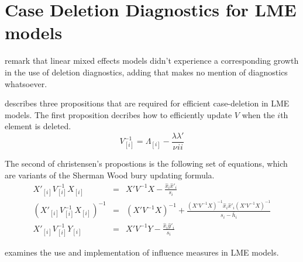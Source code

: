 \documentclass[Chap5amain.tex]{subfiles}
\begin{document}

 
 
 
 \section{Case Deletion Diagnostics for LME models}
 
 \citet{HaslettDillane} remark that linear mixed effects models
 didn't experience a corresponding growth in the use of deletion
 diagnostics, adding that \citet{McCullSearle} makes no mention of
 diagnostics whatsoever.
 
 \citet{Christensen} describes three propositions that are required
 for efficient case-deletion in LME models. The first proposition
 decribes how to efficiently update $V$ when the $i$th element is
 deleted.
 \begin{equation}
 	V_{[i]}^{-1} = \Lambda_{[i]} - \frac{\lambda
 		\lambda\prime}{\nu^{}ii}
 \end{equation}
 
 
 The second of christensen's propostions is the following set of
 equations, which are variants of the Sherman Wood bury updating
 formula.
 \begin{eqnarray}
 	X'_{[i]}V_{[i]}^{-1}X_{[i]} &=& X' V^{-1}X -
 	\frac{\hat{x}_{i}\hat{x}'_{i}}{s_{i}}\\
 	(X'_{[i]}V_{[i]}^{-1}X_{[i]})^{-1} &=& (X' V^{-1}X)^{-1} +
 	\frac{(X' V^{-1}X)^{-1}\hat{x}_{i}\hat{x}' _{i}
 		(X' V^{-1}X)^{-1}}{s_{i}- \bar{h}_{i}}\\
 	X'_{[i]}V_{[i]}^{-1}Y_{[i]} &=& X\prime V^{-1}Y -
 	\frac{\hat{x}_{i}\hat{y}' _{i}}{s_{i}}
 \end{eqnarray}
 
 
 \citet{schabenberger} examines the use and implementation of
 influence measures in LME models.
 
\end{document}

